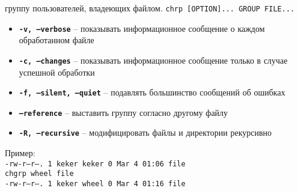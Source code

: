 \documentclass[12pt, a4paper]{article}
\begin{document}
\begin{itemize}
    группу пользователей, владеющих файлом. \texttt{chrp [OPTION]... GROUP FILE...}
  \begin{itemize}
    \item \textbf{\texttt{-v, --verbose}} -- показывать информационное сообщение
      о каждом обработанном файле
    \item \textbf{\texttt{-c, --changes}} -- показывать информационное сообщение
      только в случае успешной обработки
    \item \textbf{\texttt{-f, --silent, --quiet}} -- подавлять большинство
      сообщений об ошибках
    \item \textbf{\texttt{--reference}} -- выставить группу
      согласно другому файлу
    \item \textbf{\texttt{-R, --recursive}} -- модифицировать файлы и директории
      рекурсивно
  \end{itemize}
  Пример:\\
  \texttt{-rw-r--r--. 1 keker keker     0 Mar  4 01:06 file}\\
  \texttt{chgrp wheel file}\\
  \texttt{-rw-r--r--. 1 keker wheel     0 Mar  4 01:16 file}\\
\end{itemize}
\end{document}
